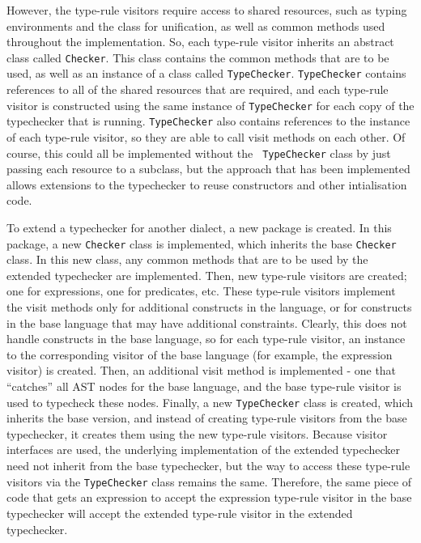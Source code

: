 \documentclass{llncs}
\begin{document}
However, the type-rule visitors require access to shared resources,
such as typing environments and the class for unification, as well as
common methods used throughout the implementation. So, each type-rule
visitor inherits an abstract class called {\tt Checker}. This class
contains the common methods that are to be used, as well as an
instance of a class called {\tt TypeChecker}. {\tt TypeChecker}
contains references to all of the shared resources that are required,
and each type-rule visitor is constructed using the same instance of
{\tt TypeChecker} for each copy of the typechecker that is
running. {\tt TypeChecker} also contains references to the instance of
each type-rule visitor, so they are able to call visit methods on each
other. Of course, this could all be implemented without the {\tt
TypeChecker} class by just passing each resource to a subclass, but
the approach that has been implemented allows extensions to the
typechecker to reuse constructors and other intialisation code.

To extend a typechecker for another dialect, a new package is created.
In this package, a new {\tt Checker} class is implemented, which
inherits the base {\tt Checker} class. In this new class, any common
methods that are to be used by the extended typechecker are
implemented. Then, new type-rule visitors are created; one for
expressions, one for predicates, etc.  These type-rule visitors
implement the visit methods only for additional constructs in the
language, or for constructs in the base language that may have
additional constraints. Clearly, this does not handle constructs in
the base language, so for each type-rule visitor, an instance to the
corresponding visitor of the base language (for example, the
expression visitor) is created. Then, an additional visit method is
implemented - one that ``catches'' all AST nodes for the base
language, and the base type-rule visitor is used to typecheck these
nodes. Finally, a new {\tt TypeChecker} class is created, which
inherits the base version, and instead of creating type-rule visitors
from the base typechecker, it creates them using the new type-rule
visitors. Because visitor interfaces are used, the underlying
implementation of the extended typechecker need not inherit from the
base typechecker, but the way to access these type-rule visitors via
the {\tt TypeChecker} class remains the same. Therefore, the same
piece of code that gets an expression to accept the expression
type-rule visitor in the base typechecker will accept the extended
type-rule visitor in the extended typechecker.
\end{document}
